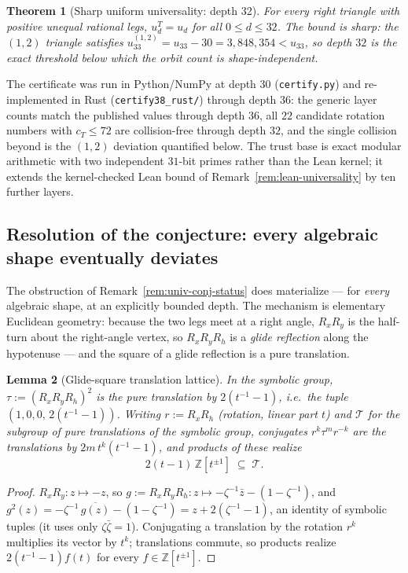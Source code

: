 \documentclass[11pt,a4paper]{article}
\newtheorem{theorem}{Theorem}
\newtheorem{lemma}[theorem]{Lemma}
\theoremstyle{remark}
\theoremstyle{plain}
\begin{document}
\begin{theorem}[Sharp uniform universality: depth 32]
\label{thm:universality-30}
For every right triangle with positive unequal rational legs,
$u_d^T = u_d$ for all $0 \le d \le 32$.  The bound is \emph{sharp}:
the $(1,2)$ triangle satisfies $u_{33}^{(1,2)} = u_{33} - 30 =
3{,}848{,}354 < u_{33}$, so depth $32$ is the exact threshold below
which the orbit count is shape-independent.
\end{theorem}

The certificate was run in Python/NumPy at depth $30$
(\texttt{certify.py}) and re-implemented in Rust
(\texttt{certify38\_rust/}) through depth $36$: the generic layer
counts match the published values through depth $36$, all $22$
candidate rotation numbers with $c_T \le 72$ are collision-free through
depth $32$, and the single collision beyond is the $(1,2)$ deviation
quantified below.  The trust base is exact modular arithmetic with two
independent $31$-bit primes rather than the Lean kernel; it extends the
kernel-checked Lean bound of Remark~\ref{rem:lean-universality} by ten
further layers.

\subsection{Resolution of the conjecture: every algebraic shape
eventually deviates}
\label{ssec:non-universality}

The obstruction of Remark~\ref{rem:univ-conj-status} does materialize
--- for \emph{every} algebraic shape, at an explicitly bounded depth.
The mechanism is elementary Euclidean geometry: because the two legs
meet at a right angle, $R_x R_y$ is the half-turn about the right-angle
vertex, so $R_x R_y R_h$ is a \emph{glide reflection} along the
hypotenuse --- and the square of a glide reflection is a pure
translation.

\begin{lemma}[Glide-square translation lattice]
\label{lem:glide-square}
In the symbolic group, $\tau := (R_x R_y R_h)^2$ is the pure
translation by $2(t^{-1}-1)$, i.e.\ the tuple
$(1, 0, 0,\, 2(t^{-1}-1))$.  Writing $r := R_x R_h$ (rotation, linear
part $t$) and $\mathcal{T}$ for the subgroup of pure translations of
the symbolic group, conjugates $r^k \tau^{m} r^{-k}$ are the
translations by $2m\,t^k(t^{-1}-1)$, and products of these realize
\[
2(t-1)\,\mathbb{Z}[t^{\pm 1}] \;\subseteq\; \mathcal{T}.
\]
\end{lemma}

\begin{proof}
$R_x R_y \colon z \mapsto -z$, so
$g := R_x R_y R_h \colon z \mapsto -\zeta^{-1}\bar z - (1 -
\zeta^{-1})$, and
$g^2(z) = -\zeta^{-1}\,\overline{g(z)} - (1-\zeta^{-1}) = z +
2(\zeta^{-1}-1)$, an identity of symbolic tuples (it uses only
$\zeta\bar\zeta = 1$).  Conjugating a translation by the rotation
$r^k$ multiplies its vector by $t^k$; translations commute, so products
realize $2(t^{-1}-1) f(t)$ for every $f \in \mathbb{Z}[t^{\pm 1}]$.
\end{proof}
\end{document}

